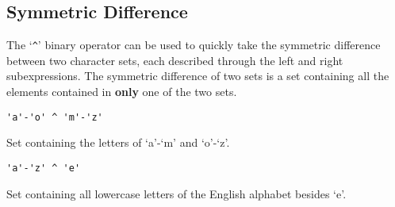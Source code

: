 
\subsection{Symmetric Difference}
{
	The `\texttt{\^}' binary operator can be used to quickly take the
	symmetric difference between two character sets, each described through
	the left and right subexpressions. The symmetric difference of two sets is
	a set containing all the elements contained in \textbf{only} one of the
	two sets.
	
	\begin{itemize}
	{
		\item[] \lstinline[language=MAIA, columns=fixed]@'a'-'o' ^ 'm'-'z'@
		
			Set containing the letters of `a'-`m'
			and `o'-`z'.
		
		\item[] \lstinline[language=MAIA, columns=fixed]@'a'-'z' ^ 'e'@
		
			Set containing all lowercase letters
			of the English alphabet besides `e'.
	}
	\end{itemize}
}
